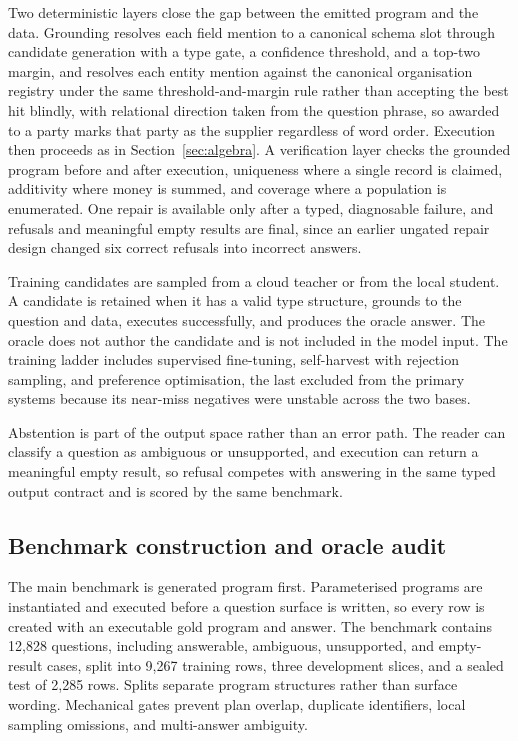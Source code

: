 \documentclass{article}
\begin{document}
Two deterministic layers close the gap between the emitted program and
the data. Grounding resolves each field mention to a canonical schema
slot through candidate generation with a type gate, a confidence
threshold, and a top-two margin, and resolves each entity mention against
the canonical organisation registry under the same threshold-and-margin
rule rather than accepting the best hit blindly, with relational
direction taken from the question phrase, so awarded to a party marks
that party as the supplier regardless of word order. Execution then
proceeds as in Section~\ref{sec:algebra}. A verification layer checks
the grounded program before and after execution, uniqueness where a
single record is claimed, additivity where money is summed, and coverage
where a population is enumerated. One repair is available only after a
typed, diagnosable failure, and refusals and meaningful empty results are
final, since an earlier ungated repair design changed six correct
refusals into incorrect answers.

Training candidates are sampled from a cloud teacher or from the local student.
A candidate is retained when it has a valid type structure, grounds to the
question and data, executes successfully, and produces the oracle answer. The
oracle does not author the candidate and is not included in the model input.
The training ladder includes supervised fine-tuning, self-harvest with
rejection sampling, and preference optimisation, the last excluded from the
primary systems because its near-miss negatives were unstable across the
two bases.

Abstention is part of the output space rather than an error path. The
reader can classify a question as ambiguous or unsupported, and execution
can return a meaningful empty result, so refusal competes with answering
in the same typed output contract and is scored by the same benchmark.

\subsection{Benchmark construction and oracle audit}
\label{sec:benchmark-build}

The main benchmark is generated program first. Parameterised programs are
instantiated and executed before a question surface is written, so every row is
created with an executable gold program and answer. The benchmark contains
12{,}828 questions, including answerable, ambiguous, unsupported, and
empty-result cases, split into 9{,}267 training rows, three development
slices, and a sealed test of 2{,}285 rows. Splits separate program
structures rather than surface wording. Mechanical gates prevent plan overlap, duplicate identifiers, local
sampling omissions, and multi-answer ambiguity.
\end{document}
